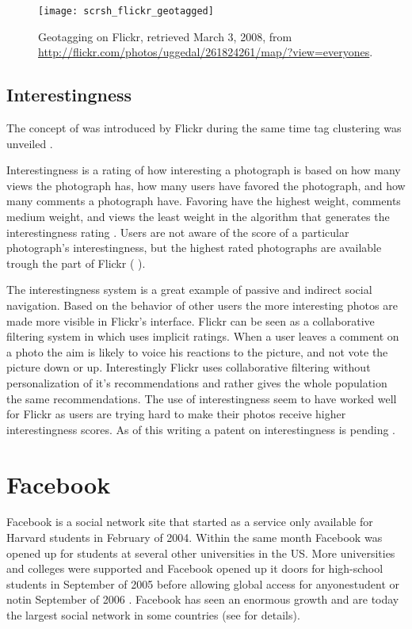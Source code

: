 \begin{figure}
  \texttt{[image: scrsh\_flickr\_geotagged]}
  \caption[Flickr Geotagging]{%
     Geotagging on Flickr,
     retrieved March 3, 2008, from
     \url{http://flickr.com/photos/uggedal/261824261/map/?view=everyones}.}
  \label{figure:scrsh.flickr.geotagged}
\end{figure}

\subsection{Interestingness}
\label{section:analysis.flickr.interestingness}

The concept of  was introduced by Flickr during
the same time tag clustering was unveiled \citep{butterfield05}.

Interestingness is a rating of how interesting a photograph is based on
how many views the photograph has, how many users have favored the
photograph, and how many comments a photograph have. Favoring have the
highest weight, comments medium weight, and views the least weight
in the algorithm that generates the interestingness rating \citep{dean08}.
Users are not aware of the score of a particular photograph's interestingness,
but the highest rated photographs are available trough the  part of
Flickr
(
).

The interestingness system is a great example of passive and indirect social
navigation. Based on the behavior of other users the more interesting photos
are made more visible in Flickr's interface. Flickr can be seen as a
collaborative filtering system in which uses implicit ratings. When a user
leaves a comment on a photo the aim is likely to voice his reactions to the
picture, and not vote the picture down or up. Interestingly Flickr uses
collaborative filtering without personalization of it's recommendations and
rather gives the whole population the same recommendations.
The use of interestingness seem
to have worked well for Flickr as users are trying hard to make their photos
receive higher interestingness scores.
As of this writing a patent on interestingness is pending
\citep{butterfield06b}.

\section{Facebook}
\label{section:analysis.facebook}

Facebook is a social network site that started as a service only available for
Harvard students in February of 2004. Within the same month Facebook was
opened up for students at several other universities in the
US. More universities and colleges were supported and Facebook opened up it
doors for high-school students in September of 2005 \citep{cassidy06}
before allowing global access for anyone\dash{}student or not\dash{}in
September of 2006 \citep{abram06}.
Facebook has seen an enormous growth and are today the largest social network
in some countries (see
for details).

